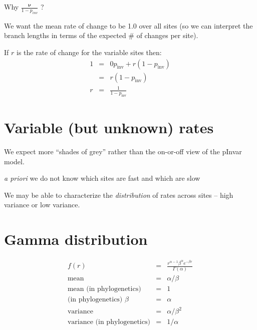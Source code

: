 \documentclass[landscape]{foils}
\begin{document}
\myNewSlide
\Large
Why $\frac{\bm \nu}{1-p_{inv}}$ ?

\large
We want the mean rate of change to be 1.0 over all sites (so we can interpret the branch lengths in terms of the expected \# of changes per site).

If $r$ is the rate of change for the variable sites then:
\begin{eqnarray*} 
	1 & = & 0 p_{\mbox{inv}} + r \left(1-p_{\mbox{inv}}\right)\\
	 & = & r \left(1-p_{\mbox{inv}}\right) \\
	 r & = & \frac{1}{1-p_{\mbox{inv}}}
\end{eqnarray*} 	

\myNewSlide
\section*{Variable (but unknown) rates}
\begin{compactitem}
	\item We expect more ``shades of grey'' rather than the on-or-off view of the pInvar model.
	\item {\em a priori} we do not know which sites are fast and which are slow
	\item We may be able to characterize the {\em distribution} of rates across sites -- high variance or low variance.
\end{compactitem}

\myNewSlide
 

\myNewSlide
\section*{Gamma distribution}
\begin{eqnarray*} 
	f(r) & = & \frac{r^{\alpha-1}\beta^{\alpha}e^{-\beta r}}{\Gamma(\alpha)} \\
	\mbox{mean} & = & \alpha/\beta \\
\mbox{mean (in phylogenetics)}	& = & 1 \\
	\mbox{(in phylogenetics) }\beta & = & \alpha \\
	\mbox{variance} & = & \alpha/{\beta^2} \\
\mbox{variance (in phylogenetics)}	& = & 1/{\alpha} \\
\end{eqnarray*} 


\myNewSlide
\end{document}
